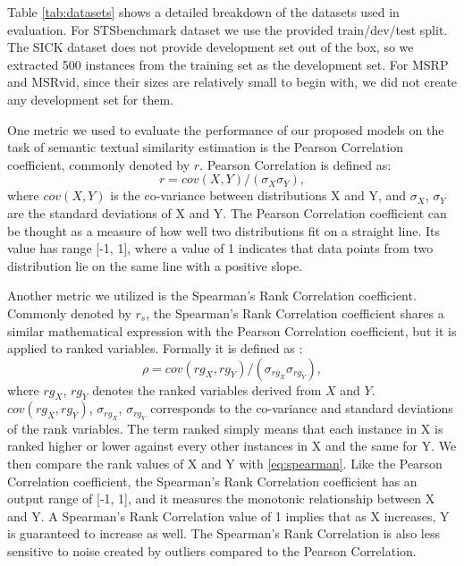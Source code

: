 Table \ref{tab:datasets} shows a detailed breakdown of the datasets used in evaluation.
For STSbenchmark dataset we use the provided train/dev/test split.
The SICK dataset does not provide development set out of the box, so we extracted 500 instances from the training set as the development set.
For MSRP and MSRvid, since their sizes are relatively small to begin with, we did not create any development set for them.

One metric we used to evaluate the performance of our proposed models on the task of semantic textual similarity estimation is the Pearson Correlation coefficient, commonly denoted by $r$. Pearson Correlation is defined as:
\begin{equation}
\label{eq:pearson}
 r = cov(X,Y) /( \sigma_X \sigma_Y),
\end{equation}
where $cov(X,Y)$ is the co-variance between distributions X and Y, and $\sigma_X$, $\sigma_Y$ are the standard deviations of X and Y.
The Pearson Correlation coefficient can be thought as a measure of how well two distributions fit on a straight line. Its value has range [-1, 1], where a value of 1 indicates that data points from two distribution lie on the same line with a positive slope.

Another metric we utilized is the Spearman's Rank Correlation coefficient. Commonly denoted by $r_s$, the Spearman's Rank Correlation coefficient shares a similar mathematical expression with the Pearson Correlation coefficient, but it is applied to ranked variables.
Formally it is defined as \cite{wiki:spearman}:
\begin{equation}
\label{eq:spearman}
 \rho = cov(rg_X, rg_Y) / (\sigma_{rg_X} \sigma_{rg_Y}),
\end{equation}
where $rg_X$, $rg_Y$ denotes the ranked variables derived from $X$ and $Y$. $cov(rg_X,rg_Y)$, $\sigma_{rg_X}$, $\sigma_{rg_Y}$ corresponds to the co-variance and standard deviations of the rank variables. The term ranked simply means that each instance in X is ranked higher or lower against every other instances in X and the same for Y. We then compare the rank values of X and Y with \ref{eq:spearman}. Like the Pearson Correlation coefficient, the Spearman's Rank Correlation coefficient has an output range of [-1, 1], and it measures the monotonic relationship between X and Y. A Spearman's Rank Correlation value of 1 implies that as X increases, Y is guaranteed to increase as well.
The Spearman's Rank Correlation is also less sensitive to noise created by outliers compared to the Pearson Correlation.

